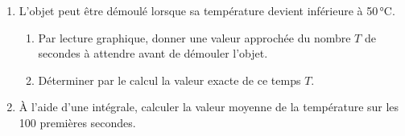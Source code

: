\begin{enumerate}
	\item L'objet peut être démoulé lorsque sa température devient inférieure à 50\,°C.
	\begin{enumerate}
		\item Par lecture graphique, donner une valeur approchée du nombre $T$ de secondes à attendre avant de démouler l'objet.
		\item Déterminer par le calcul la valeur exacte de ce temps $T$.
	\end{enumerate}
	\item À l'aide d'une intégrale, calculer la valeur moyenne de la température sur les 100 premières secondes.
\end{enumerate}